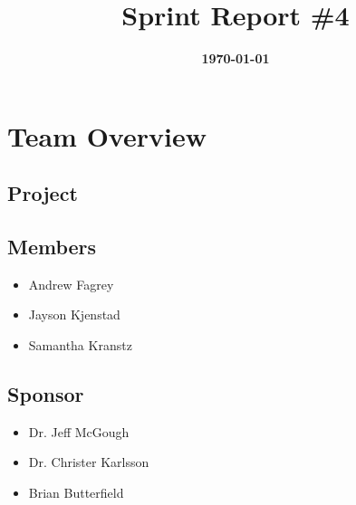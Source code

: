 \documentclass{article}
\title{\normalfont\Large\bfseries\color{TitleColor}Sprint Report \#4}
\date{\normalfont\bfseries\color{TitleColor}\today}
\begin{document}
\maketitle

\section*{Team Overview}
\subsection*{Project}

\subsection*{Members}
\begin{itemize}
	\item Andrew Fagrey
	\item Jayson Kjenstad
	\item Samantha Kranstz
\end{itemize}

\subsection*{Sponsor}
\begin{itemize}
	\item Dr. Jeff McGough
	\item Dr. Christer Karlsson
	\item Brian Butterfield
\end{itemize}
\end{document}
